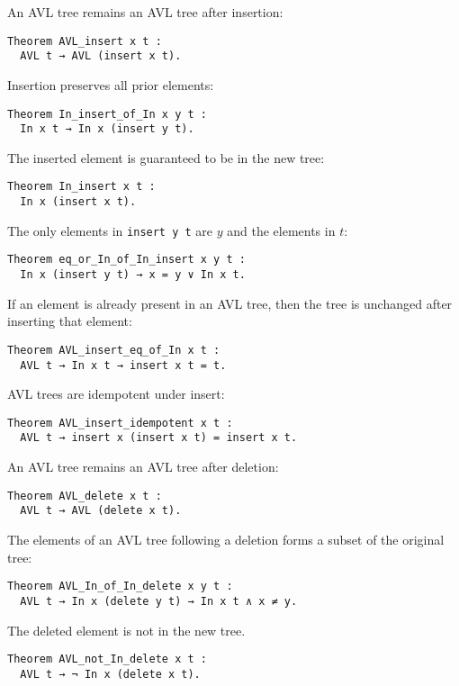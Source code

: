 \documentclass[acmsmall, authorversion, nonacm, overload]{acmart}
\begin{document}
\noindent An AVL tree remains an AVL tree after insertion:
\begin{verbatim}
Theorem AVL_insert x t :
  AVL t → AVL (insert x t).
\end{verbatim}

\noindent Insertion preserves all prior elements:
\begin{verbatim}
Theorem In_insert_of_In x y t :
  In x t → In x (insert y t).
\end{verbatim}

\noindent The inserted element is guaranteed to be in the new tree:
\begin{verbatim}
Theorem In_insert x t :
  In x (insert x t).
\end{verbatim}

\noindent The only elements in \verb|insert y t| are $y$ and the elements in $t$:
\begin{verbatim}
Theorem eq_or_In_of_In_insert x y t :
  In x (insert y t) → x = y ∨ In x t.
\end{verbatim}

\noindent If an element is already present in an AVL tree, then the tree is unchanged after inserting that element:
\begin{verbatim}
Theorem AVL_insert_eq_of_In x t :
  AVL t → In x t → insert x t = t.
\end{verbatim}

\noindent AVL trees are idempotent under insert:
\begin{verbatim}
Theorem AVL_insert_idempotent x t :
  AVL t → insert x (insert x t) = insert x t.
\end{verbatim}

\noindent An AVL tree remains an AVL tree after deletion:
\begin{verbatim}
Theorem AVL_delete x t :
  AVL t → AVL (delete x t).
\end{verbatim}

\noindent The elements of an AVL tree following a deletion forms a subset of the original tree:
\begin{verbatim}
Theorem AVL_In_of_In_delete x y t :
  AVL t → In x (delete y t) → In x t ∧ x ≠ y.
\end{verbatim}

\noindent The deleted element is not in the new tree.
\begin{verbatim}
Theorem AVL_not_In_delete x t :
  AVL t → ¬ In x (delete x t).
\end{verbatim}
\end{document}
